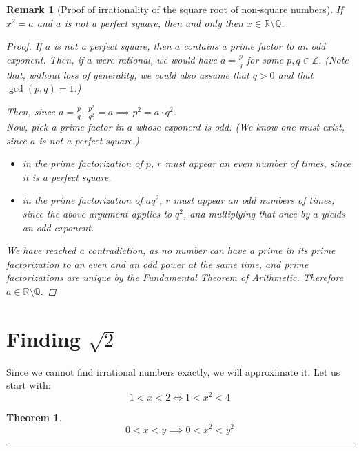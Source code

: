 \documentclass{article}
\newtheorem{theorem}{Theorem}
\newtheorem{remark}{Remark}
\begin{document}
\begin{remark}[Proof of irrationality of the square root of non-square numbers]
If $x^2 = a$ and $a$ is not a perfect square, then and only then $x \in \mathbb{R} \setminus \mathbb{Q}$.
    \begin{proof}
        If $a$ is not a perfect square, then $a$ contains a prime factor to an odd exponent. Then, if $a$ were rational, we would have $a = \frac{p}{q}$ for some $p, q \in \mathbb{Z}$. (Note that, without loss of generality, we could also assume that $q > 0$ and that $\gcd(p, q) = 1$.)

        Then, since $a = \frac{p}{q}$, $\frac{p^2}{q^2} = a \implies p^2 = a\cdot q^2$.\\
        Now, pick a prime factor in $a$ whose exponent is odd. (We know one must exist, since $a$ is not a perfect square.)
        \begin{itemize}
            \item in the prime factorization of $p$, $r$ must appear an even number of times, since it is a perfect square.
            \item in the prime factorization of $aq^2$, $r$ must appear an odd numbers of times, since the above argument applies to $q^2$, and multiplying that once by $a$ yields an odd exponent.
        \end{itemize}
        We have reached a contradiction, as no number can have a prime in its prime factorization to an even and an odd power at the same time, and prime factorizations are unique by the Fundamental Theorem of Arithmetic. Therefore $a \in \mathbb{R} \setminus \mathbb{Q}.$
        
    \end{proof}
\end{remark}

\section{Finding $\sqrt{2}$}
Since we cannot find irrational numbers exactly, we will approximate it. Let us start with:
\[
1 < x < 2 \Leftrightarrow 1 < x^2 < 4
\]
\begin{theorem}
    \[
    0 < x < y \implies 0 < x^2 < y^2
    \]
\end{theorem}
\hrule
\vspace{1em}
\end{document}
